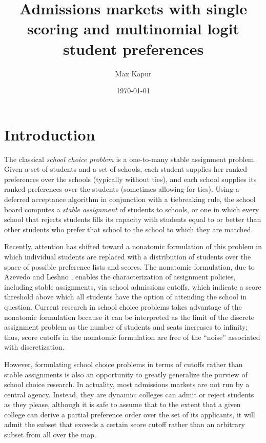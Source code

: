 \documentclass[12pt]{article}
\title{Admissions markets with single scoring and multinomial logit student preferences}
\date{\today}
\author{Max Kapur}
\theoremstyle{definition}
\begin{document}
\maketitle

\pagebreak
\tableofcontents

\pagebreak
\section{Introduction}
The classical \emph{school choice problem} is a one-to-many stable assignment problem. Given a set of students and a set of schools, each student supplies her ranked preferences over the schools (typically without ties), and each school supplies its ranked preferences over the students (sometimes allowing for ties). Using a deferred acceptance algorithm in conjunction with a tiebreaking rule, the school board computes a \emph{stable assignment} of students to schools, or one in which every school that rejects students fills its capacity with students equal to or better than other students who prefer that school to the school to which they are matched.

Recently, attention has shifted toward a nonatomic formulation of this problem in which individual students are replaced with a distribution of students over the space of possible preference lists and scores. The nonatomic formulation, due to Azevedo and Leshno \parencite*{supplydemandfw}, enables the characterization of assignment policies, including stable assignments, via school admissions cutoffs, which indicate a score threshold above which all students have the option of attending the school in question. Current research in school choice problems takes advantage of the nonatomic formulation because it can be interpreted as the limit of the discrete assignment problem as the number of students and seats increases to infinity; thus, score cutoffs in the nonatomic formulation are free of the ``noise'' associated with discretization. 

However, formulating school choice problems in terms of cutoffs rather than stable assignments is also an opportunity to greatly generalize the purview of school choice research. In actuality, most admissions markets are not run by a central agency. Instead, they are dynamic: colleges can admit or reject students as they please, although it is safe to assume that to the extent that a given college can derive a partial preference order over the set of its applicants, it will admit the subset that exceeds a certain score cutoff rather than an arbitrary subset from all over the map. 
\end{document}
